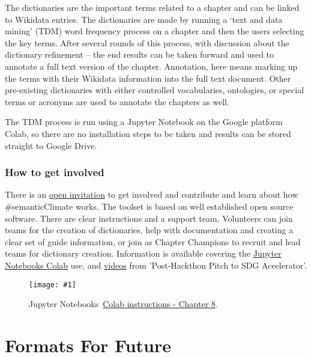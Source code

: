 \documentclass{article}
\newlength{\imgwidth}
\newcommand\scaledgraphics[2]{%
                
\settowidth{\imgwidth}{\texttt{[image: \#1]}}%
                
\setlength{\imgwidth}{\minof{\imgwidth}{#2\textwidth}}%
                
\texttt{[image: \#1]}%
                
}
\begin{document}
The dictionaries are the important terms related to a chapter and can be linked to Wikidata entries. The dictionaries are made by running a ‘text and data mining’ (TDM) word frequency process on a chapter and then the users selecting the key terms. After several rounds of this process, with discussion about the dictionary refinement – the end results can be taken forward and used to annotate a full text version of the chapter. Annotation, here means marking up the terms with their Wikidata information into the full text document. Other pre-existing dictionaries with either controlled vocabularies, ontologies, or special terms or acronyms are used to annotate the chapters as well.


The TDM process is run using a Jupyter Notebook on the Google platform Colab, so there are no installation steps to be taken and results can be stored straight to Google Drive.


\subsubsection{How to get involved}\label{H7556542}



There is an \href{https://www.eventbrite.co.uk/e/formats-for-future-liberating-and-semantify-ipcc-reports-tickets-439057261087}{open invitation} to get involved and contribute and learn about how \#semanticClimate works. The toolset is based on well established open source software. There are clear instructions and a support team. Volunteers can join teams for the creation of dictionaries, help with documentation and creating a clear set of guide information, or join as Chapter Champions to recruit and lead teams for dictionary creation. Information is available covering the \href{https://github.com/petermr/semanticClimate/blob/main/outreach/climate_knowledge_hunt_hackathon/Hackathon_Notebook/climate_hackathon_chapter08.ipynb}{Jupyter Notebooks Colab} use, and \href{https://youtu.be/0MGXic-uEQY}{videos} from 'Post-Hackthon Pitch to SDG Accelerator'.

\begin{figure}
\scaledgraphics{60fa6ce5-6219-409f-93a2-6e44ceca3a6c.png}{1}
\caption*{Jupyter Notebooks \href{https://github.com/petermr/semanticClimate/blob/main/outreach/climate_knowledge_hunt_hackathon/Hackathon_Notebook/climate_hackathon_chapter08.ipynb}{Colab instructions - Chapter 8}.}\label{F31001221}
\end{figure}


\section{Formats For Future}\label{H9681509}
\end{document}

